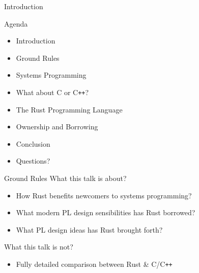 \begin{section}{Introduction}
  \begin{frame}{Agenda}
    \begin{itemize}
    \item Introduction
    \item Ground Rules
    \item Systems Programming
    \item What about C or C\texttt{++}?
    \item The Rust Programming Language
    \item Ownership and Borrowing
    \item Conclusion
    \item Questions?
    \end{itemize}
  \end{frame}

  \begin{frame}{Ground Rules}
    What this talk is about?
    \begin{itemize}
    \item How Rust benefits newcomers to systems programming?
    \item What modern PL design sensibilities has Rust borrowed?
    \item What PL design ideas has Rust brought forth?
    \end{itemize}

    What this talk is not?
    \begin{itemize}
    \item Fully detailed comparison between Rust \& C/C\texttt{++}
    \end{itemize}
  \end{frame}
\end{section}
